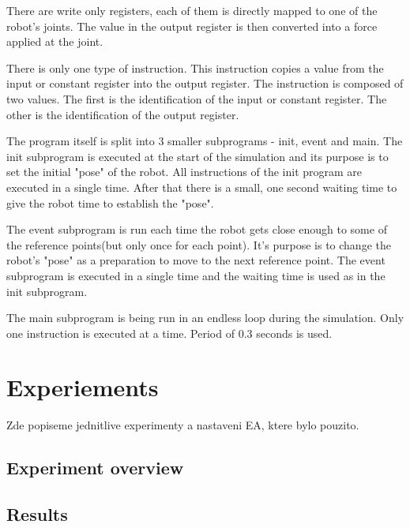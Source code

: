 \documentclass{ExcelAtFIT}
\begin{document}
There are write only registers, each of them is directly mapped to one of the robot's joints.
The value in the output register is then converted into a force applied at the joint.

There is only one type of instruction.
This instruction copies a value from the input or constant register into the output register.
The instruction is composed of two values.
The first is the identification of the input or constant register.
The other is the identification of the output register.

The program itself is split into 3 smaller subprograms - init, event and main.
The init subprogram is executed at the start of the simulation and its purpose is to set the initial "pose" of the robot.
All instructions of the init program are executed in a single time.
After that there is a small, one second waiting time to give the robot time to establish the "pose".

The event subprogram is run each time the robot gets close enough to some of the reference points(but only once for each point).
It's purpose is to change the robot's "pose" as a preparation to move to the next reference point.
The event subprogram is executed in a single time and the waiting time is used as in the init subprogram.

The main subprogram is being run in an endless loop during the simulation.
Only one instruction is executed at a time.
Period of 0.3 seconds is used.


\section{Experiements}
\label{sec:Experiments}
Zde popiseme jednitlive experimenty a nastaveni EA, ktere bylo pouzito.

\subsection{Experiment overview}

\subsection{Results}
\end{document}

